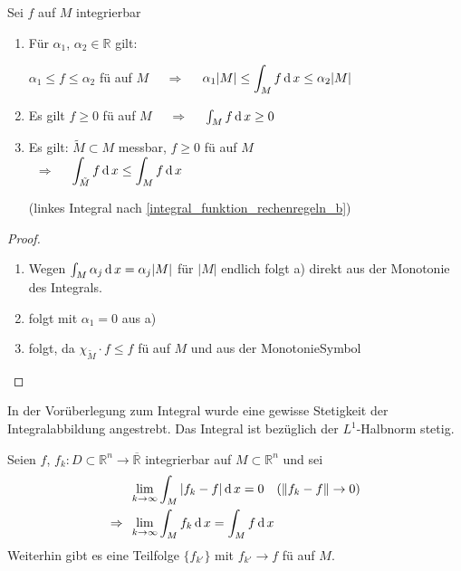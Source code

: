 \begin{conclusion}
	Sei $f$ auf $M$ integrierbar\begin{enumerate}[label={\alph*)}]
		\item Für $\alpha_1$, $\alpha_2\in\mathbb{R}$ gilt:\begin{center}
			$\alpha_1\le f \le \alpha_2$ \gls{fü} auf $M$ \ \ $\Rightarrow$ \ \ $\displaystyle \alpha_1 \vert M \vert \le \int_M f \operatorname{d} x \le \alpha_2 \vert M \vert$
		\end{center}
		\item Es gilt $f\ge 0$ \gls{fü} auf $M$ \ \ $\Rightarrow$ \ \ $\int_M f \operatorname{d} x\ge 0$
		\item Es gilt: $\tilde{M}\subset M$ messbar, $f\ge 0$ \gls{fü} auf $M$ \\
		\ $\Rightarrow$ \ \ $\displaystyle \int_{\tilde{M}} f \operatorname{d} x \le \int_M f \operatorname{d} x$
		
		(linkes Integral nach  \ref{integral_funktion_rechenregeln_b})
	\end{enumerate}
\end{conclusion}

\begin{proof}\hspace*{0pt}
	\NoEndMark
	\begin{enumerate}[label={zu \alph*)},topsep=\dimexpr-\baselineskip/2\relax,leftmargin=\widthof{\texttt{zu a)\ }}]
		\item 
		Wegen $\int_M \alpha_j \operatorname{d} x = \alpha_j \vert M \vert $ für $\vert M \vert$ endlich folgt a) direkt aus der Monotonie des Integrals.
		\item folgt mit $\alpha_1=0$ aus a)
		\item folgt, da $\chi_{\tilde{M}}\cdot f \le f$ \gls{fü} auf $M$ und aus der Monotonie\hfill\csname\InTheoType Symbol\endcsname
	\end{enumerate}
\end{proof}

In der Vorüberlegung zum Integral wurde eine gewisse Stetigkeit der Integralabbildung angestrebt. Das Integral ist bezüglich der $L^1$-Halbnorm stetig.
\begin{proposition}
	Seien $f$, $f_k:D\subset\mathbb{R}^n\to\overline{\mathbb{R}}$ integrierbar auf $M\subset\mathbb{R}^n$ und sei \begin{align*}
		& \lim\limits_{k\to\infty} \int_M \vert f_k - f\vert \operatorname{d} x = 0 \quad(\Vert f_k - f\Vert\to0)\\
		\Rightarrow\;\;&\lim\limits_{k\to\infty} \int_M f_k \operatorname{d} x = \int_M f\operatorname{d} x
	\end{align*}
	Weiterhin gibt es eine Teilfolge $\{ f_{k'}\}$ mit $f_{k'}\to f$ \gls{fü} auf $M$.
\end{proposition}

